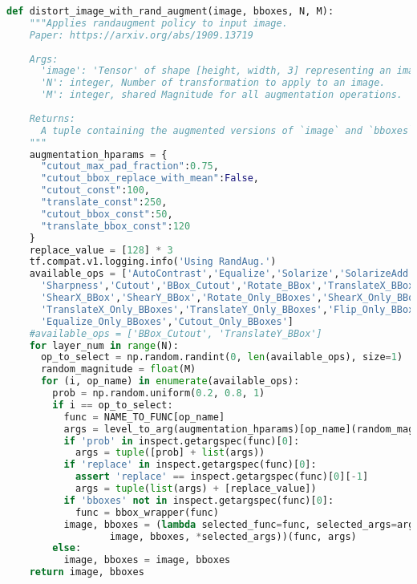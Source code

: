 \begin{lstlisting}[caption={Funzione per implementare RandAugment}, language=Python, basicstyle=\tiny,label=code:rand_augment_function]
    def distort_image_with_rand_augment(image, bboxes, N, M):
    """Applies randaugment policy to input image.
    Paper: https://arxiv.org/abs/1909.13719
    
    Args:
      'image': 'Tensor' of shape [height, width, 3] representing an image.
      'N': integer, Number of transformation to apply to an image.
      'M': integer, shared Magnitude for all augmentation operations.
    
    Returns:
      A tuple containing the augmented versions of `image` and `bboxes`.
    """
    augmentation_hparams = {
      "cutout_max_pad_fraction":0.75,
      "cutout_bbox_replace_with_mean":False,
      "cutout_const":100,
      "translate_const":250,
      "cutout_bbox_const":50,
      "translate_bbox_const":120
    }
    replace_value = [128] * 3 
    tf.compat.v1.logging.info('Using RandAug.')
    available_ops = ['AutoContrast','Equalize','Solarize','SolarizeAdd','Contrast','Brightness',
      'Sharpness','Cutout','BBox_Cutout','Rotate_BBox','TranslateX_BBox','TranslateY_BBox',
      'ShearX_BBox','ShearY_BBox','Rotate_Only_BBoxes','ShearX_Only_BBoxes','ShearY_Only_BBoxes',
      'TranslateX_Only_BBoxes','TranslateY_Only_BBoxes','Flip_Only_BBoxes','Solarize_Only_BBoxes',
      'Equalize_Only_BBoxes','Cutout_Only_BBoxes']
    #available_ops = ['BBox_Cutout', 'TranslateY_BBox']
    for layer_num in range(N):
      op_to_select = np.random.randint(0, len(available_ops), size=1)
      random_magnitude = float(M) 
      for (i, op_name) in enumerate(available_ops): 
        prob = np.random.uniform(0.2, 0.8, 1) 
        if i == op_to_select:
          func = NAME_TO_FUNC[op_name]
          args = level_to_arg(augmentation_hparams)[op_name](random_magnitude)
          if 'prob' in inspect.getargspec(func)[0]:
            args = tuple([prob] + list(args))
          if 'replace' in inspect.getargspec(func)[0]:
            assert 'replace' == inspect.getargspec(func)[0][-1]
            args = tuple(list(args) + [replace_value])
          if 'bboxes' not in inspect.getargspec(func)[0]:
            func = bbox_wrapper(func)
          image, bboxes = (lambda selected_func=func, selected_args=args: selected_func(
                  image, bboxes, *selected_args))(func, args)
        else:
          image, bboxes = image, bboxes
    return image, bboxes
  
\end{lstlisting}